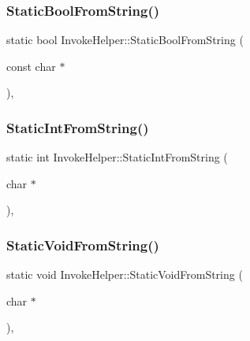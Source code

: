 \subsubsection{\texorpdfstring{Static\+Bool\+From\+String()}{StaticBoolFromString()}}
{\footnotesize\ttfamily static bool Invoke\+Helper\+::\+Static\+Bool\+From\+String (\begin{DoxyParamCaption}\item[{const char $\ast$}]{ }\end{DoxyParamCaption})\hspace{0.3cm}{\ttfamily [inline]}, {\ttfamily [static]}}

\mbox{\label{class_invoke_helper_a5cfb11cca70ec5a9f59e8b7a4d4c2f85}} 
\subsubsection{\texorpdfstring{Static\+Int\+From\+String()}{StaticIntFromString()}}
{\footnotesize\ttfamily static int Invoke\+Helper\+::\+Static\+Int\+From\+String (\begin{DoxyParamCaption}\item[{char $\ast$}]{ }\end{DoxyParamCaption})\hspace{0.3cm}{\ttfamily [inline]}, {\ttfamily [static]}}

\mbox{\label{class_invoke_helper_a5e95ce4214e89b180da9953d94396536}} 
\subsubsection{\texorpdfstring{Static\+Void\+From\+String()}{StaticVoidFromString()}}
{\footnotesize\ttfamily static void Invoke\+Helper\+::\+Static\+Void\+From\+String (\begin{DoxyParamCaption}\item[{char $\ast$}]{ }\end{DoxyParamCaption})\hspace{0.3cm}{\ttfamily [inline]}, {\ttfamily [static]}}

